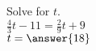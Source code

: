 \documentclass{ximera}
\author{David Kish}
\begin{document}
\begin{exercise}
Solve for $t$.\\
$\frac{4}{3}t-11=\frac{2}{9}t+9$\\
$t=\answer{18}$
\end{exercise}
\end{document}
